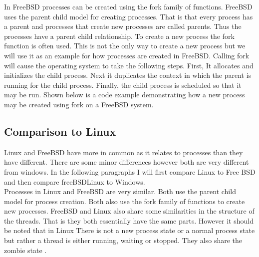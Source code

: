 \documentclass[letterpaper, onecolumn,10pt]{IEEEtran}
\begin{document}
			In FreeBSD processes can be created using the fork family of functions. FreeBSD uses the parent child model for creating processes. That is that every process has a parent and processes that create new processes are called parents. Thus the processes have a parent child relationship. To create a new process the fork function is often used. This is not the only way to create a new process but we will use it as an example for how processes are created in FreeBSD. Calling fork will cause the operating system to take the following steps. First, It allocates and initializes the child process. Next it duplicates the context in which the parent is running for the child process. Finally, the child process is scheduled so that it may be run. Shown below is a code example demonstrating how a new process may be created using fork on a FreeBSD system\cite{FreeBSD}.\\
			
			
			
			
			
			\subsection{Comparison to Linux}
			Linux and FreeBSD have more in common as it relates to processes than they have different. There are some minor differences however both are very different from windows. In the following paragraphs I will first compare Linux to Free BSD and then compare freeBSD\/Linux to Windows.\\
			
			Processes in Linux and FreeBSD are very similar. Both use the parent child model for process creation. Both also use the fork family of functions to create new processes. FreeBSD and Linux also share some similarities in the structure of the threads. That is they both essentially have the same parts. However it should be noted that in Linux There is not a new process state or a normal process state but rather a thread is either running, waiting or stopped. They also share the zombie state\cite{FreeBSD} \cite{Linux}.\\
			
\end{document}
